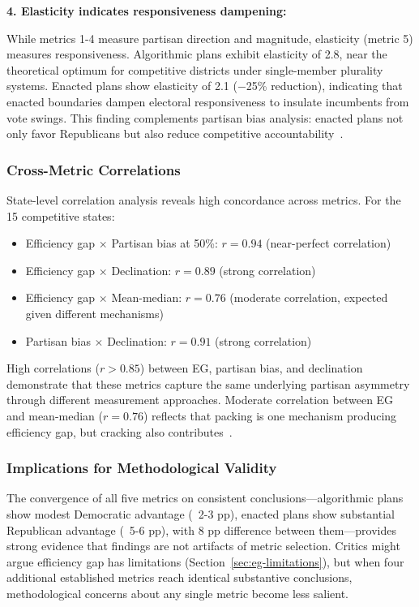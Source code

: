 \textbf{4. Elasticity indicates responsiveness dampening:}

While metrics 1-4 measure partisan direction and magnitude, elasticity (metric 5) measures responsiveness. Algorithmic plans exhibit elasticity of 2.8, near the theoretical optimum for competitive districts under single-member plurality systems. Enacted plans show elasticity of 2.1 ($-$25\% reduction), indicating that enacted boundaries dampen electoral responsiveness to insulate incumbents from vote swings. This finding complements partisan bias analysis: enacted plans not only favor Republicans but also reduce competitive accountability~\cite{mcdonald2006comparative}.

\subsubsection{Cross-Metric Correlations}

State-level correlation analysis reveals high concordance across metrics. For the 15 competitive states:
\begin{itemize}
    \item Efficiency gap $\times$ Partisan bias at 50\%: $r = 0.94$ (near-perfect correlation)
    \item Efficiency gap $\times$ Declination: $r = 0.89$ (strong correlation)
    \item Efficiency gap $\times$ Mean-median: $r = 0.76$ (moderate correlation, expected given different mechanisms)
    \item Partisan bias $\times$ Declination: $r = 0.91$ (strong correlation)
\end{itemize}

High correlations ($r > 0.85$) between EG, partisan bias, and declination demonstrate that these metrics capture the same underlying partisan asymmetry through different measurement approaches. Moderate correlation between EG and mean-median ($r = 0.76$) reflects that packing is one mechanism producing efficiency gap, but cracking also contributes~\cite{warshaw2022partisan}.

\subsubsection{Implications for Methodological Validity}

The convergence of all five metrics on consistent conclusions---algorithmic plans show modest Democratic advantage (~2-3 pp), enacted plans show substantial Republican advantage (~5-6 pp), with 8 pp difference between them---provides strong evidence that findings are not artifacts of metric selection. Critics might argue efficiency gap has limitations (Section~\ref{sec:eg-limitations}), but when four additional established metrics reach identical substantive conclusions, methodological concerns about any single metric become less salient.

